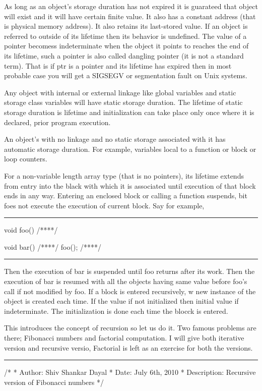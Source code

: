 As long as an object's storage duration has not expired it is
guarateed that object will exist and it will have certain finite
value. It also has a constant address (that is physical memory
address). It also retains its last-stored value. If an object is
referred to outside of its lifetime then its behavior is
undefined. The value of a pointer becomess indeterminate when the
object it points to reaches the end of its lifetime, such a pointer is
also called dangling pointer (it is not a standard term). That is if
ptr is a pointer and its lifetime has expired then in most probable
case you will get a SIGSEGV or segmentation fault on Unix systems.

Any object with internal or external linkage like global variables and
static storage class variables will have static storage duration. The
lifetime of static storage duration is lifetime and initialization can
take place only once where it is declared, prior program execution.

An object's with no linkage and no static storage associated with
it has automatic storage duration. For example, variables local to a
function or block or loop counters.

For a non-variable length array type (that is no pointers), its
lifetime extends from entry into the black with which it is associated
until execution of that block ends in any way. Entering an enclosed
block or calling a function suspends, bit foes not execute the
execution of current block. Say for example,
\blank[force,1mm]\hrule\blank[force,1mm]
\startCPP
void foo()
{
/****/
}

void bar()
{
/****/
foo();
/****/
}
\stopCPP
\blank[force,1mm]\hrule\blank[force,1mm]
Then the execution of bar is suspended until foo returns after its
work. Then the execution of bar is resumed with all the objects
having same value before foo's call if not modified by foo. If a block
is entered recursively, w new instance of the object is created each
time. If the value if not initialized then initial value if
indeterminate. The initialization is done each time the blocck is
entered.

This introduces the concept of recursion so let us do it. Two famous
problems are there; Fibonacci numbers and factorial computation. I
will give both iterative version and recursive versio, Factorial is
left as an exercise for both the versions.
\blank[force,1mm]\hrule\blank[force,1mm]
\startCPP
/*
 * Author: Shiv Shankar Dayal
 * Date: July 6th, 2010
 * Description: Recursive version of Fibonacci numbers
 */

